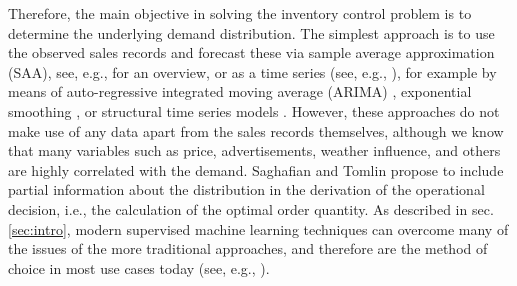 \documentclass[BCOR=1mm, DIV=calc,10pt,
twoside=true,
twocolumn,
headings=normal]{scrartcl}
\begin{document}
Therefore, the main objective in solving the inventory control problem is to determine the underlying demand distribution. The simplest approach is to use the observed sales records and forecast these via sample average approximation (SAA), see, e.g., \cite{shapiro2014} for an overview, or as a time series (see, e.g., \cite{alwan2016}), for example by means of auto-regressive integrated moving average (ARIMA) \cite{BoxJenkins}, exponential smoothing \cite{ExponentialSmoothing}, or structural time series models \cite{StructuralTS}. However, these approaches do not make use of any data apart from the sales records themselves, although we know that many variables such as price, advertisements,  weather influence, and others are highly correlated with the demand. Saghafian and Tomlin \cite{saghafian2016newsvendor} propose to include partial information about the distribution in the derivation of the operational decision, i.e., the calculation of the optimal order quantity. As described in sec. \ref{sec:intro}, modern supervised machine learning techniques can overcome many of the issues of the more traditional approaches, and therefore are the method of choice in most use cases today (see, e.g., \cite{tsforecasting,ZHANG199835,rnn,transformer}).
\end{document}
